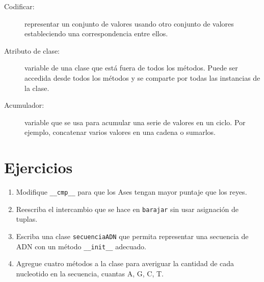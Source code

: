 \begin{description}

\item[Codificar:]  representar un conjunto de valores usando
otro conjunto de valores estableciendo una correspondencia 
entre ellos.

\item[Atributo de clase:] variable de una clase que está
fuera de todos los métodos. Puede ser accedida desde todos los
métodos y se comparte por todas las instancias de la clase.

\item[Acumulador:] variable que se usa para acumular una
serie de valores en un ciclo. Por ejemplo, concatenar varios
valores en una cadena o sumarlos.


\end{description}

\section{Ejercicios}
\begin{enumerate}

\item Modifique \texttt{\_\_cmp\_\_} para que los Ases tengan mayor puntaje que los reyes.

\item Reescriba el intercambio que se hace en \texttt{barajar} sin usar asignación de
tuplas.

\item Escriba una clase \texttt{secuenciaADN} que permita representar una secuencia de ADN 
con un método \texttt{\_\_init\_\_} adecuado.

\item Agregue cuatro métodos a la clase para averiguar la cantidad de cada nucleotido en la
secuencia, cuantas A, G, C, T.

\end{enumerate}